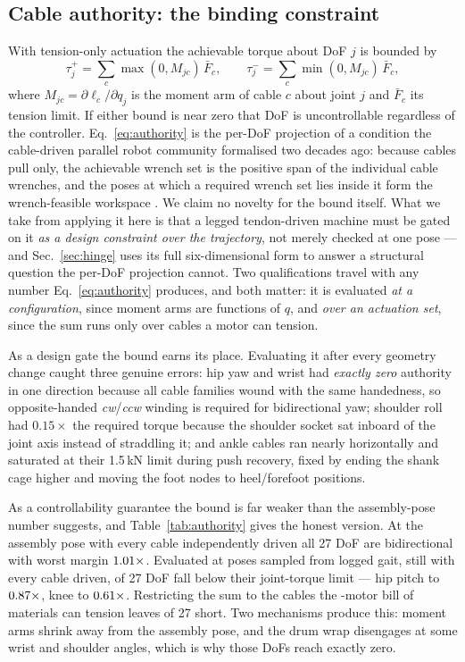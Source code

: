 \documentclass[conference]{IEEEtran}
\newcommand{\Fmax}{\bar{F}}
\begin{document}
\subsection{Cable authority: the binding constraint}
\label{sec:authority}
With tension-only actuation the achievable torque about DoF $j$ is bounded by
\begin{equation}
  \tau_j^{+} = \sum_c \max(0, M_{jc})\,\Fmax_c,\qquad
  \tau_j^{-} = \sum_c \min(0, M_{jc})\,\Fmax_c,
  \label{eq:authority}
\end{equation}
where $M_{jc}=\partial \ell_c/\partial q_j$ is the moment arm of cable $c$
about joint $j$ and $\Fmax_c$ its tension limit. If either bound is near zero
that DoF is uncontrollable regardless of the controller. Eq.~\eqref{eq:authority}
is the per-DoF projection of a condition the cable-driven parallel robot
community formalised two decades ago: because cables pull only, the achievable
wrench set is the positive span of the individual cable wrenches, and the poses
at which a required wrench set lies inside it form the wrench-feasible
workspace \cite{bosscher2004wrench,gouttefarde2006wrench,gouttefarde2007wfw}.
We claim no novelty for the bound itself. What we take from applying it here is
that a legged tendon-driven machine must be gated on it \emph{as a design
constraint over the trajectory}, not merely checked at one pose --- and
Sec.~\ref{sec:hinge} uses its full six-dimensional form to answer a structural
question the per-DoF projection cannot. Two qualifications
travel with any number Eq.~\eqref{eq:authority} produces, and both matter: it
is evaluated \emph{at a configuration}, since moment arms are functions of
$q$, and \emph{over an actuation set}, since the sum runs only over cables a
motor can tension.

As a design gate the bound earns its place. Evaluating it after every geometry
change caught three genuine errors: hip yaw and wrist had \emph{exactly zero}
authority in one direction because all cable families wound with the same
handedness, so opposite-handed \emph{cw}/\emph{ccw} winding is required for
bidirectional yaw; shoulder roll had $0.15\times$ the required torque because
the shoulder socket sat inboard of the joint axis instead of straddling it;
and ankle cables ran nearly horizontally and saturated at their 1.5\,kN limit
during push recovery, fixed by ending the shank cage higher and moving the
foot nodes to heel/forefoot positions.

As a controllability guarantee the bound is far weaker than the assembly-pose
number suggests, and Table~\ref{tab:authority} gives the honest version. At
the assembly pose with every cable independently driven all 27 DoF are
bidirectional with worst margin $1.01\times$. Evaluated at poses
sampled from logged gait, still with every cable driven,
\authShortGaitAll{} of 27 DoF fall below their joint-torque limit --- hip
pitch to $0.87\times$, knee to $0.61\times$. Restricting the
sum to the \numDrivenCables{} cables the \numMotors{}-motor bill of materials
can tension leaves \authShortGaitBom{} of 27 short. Two mechanisms produce
this: moment arms shrink away from the assembly pose, and the drum wrap
disengages at some wrist and shoulder angles, which is why those DoFs reach
exactly zero.
\end{document}

